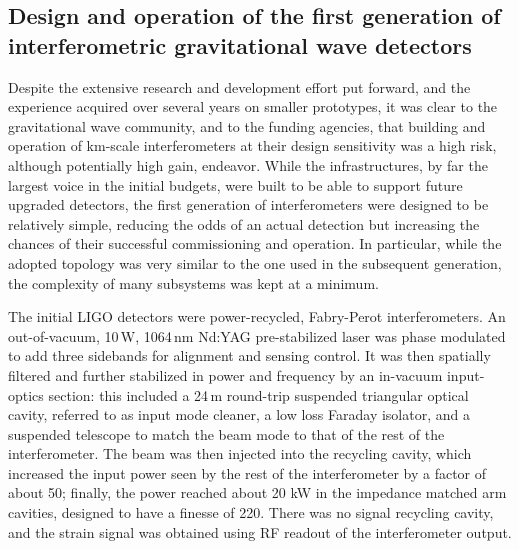 \subsection{Design and operation of the first generation of interferometric gravitational wave detectors}\label{subsec:1stgen}

Despite the extensive research and development effort put forward, and the experience acquired over several years on smaller prototypes, it was clear to the gravitational wave community, and to the funding agencies, that building and operation of km-scale interferometers at their design sensitivity was a high risk, although potentially high gain, endeavor.
While the infrastructures, by far the largest voice in the initial budgets, were built to be able to support future upgraded detectors, the first generation of interferometers were designed to be relatively simple, reducing the odds of an actual detection but increasing the chances of their successful commissioning and operation.
In particular, while the adopted topology was very similar to the one used in the subsequent generation, the complexity of many subsystems was kept at a minimum.

The initial LIGO detectors\cite{Abbott_2004,Abbott_2009} were power-recycled, Fabry-Perot interferometers.
An out-of-vacuum, 10\,W, 1064\,nm Nd:YAG pre-stabilized laser was phase modulated to add three sidebands for alignment and sensing control.
It was then spatially filtered and further stabilized in power and frequency by an in-vacuum input-optics section: this included a 24\,m round-trip suspended triangular optical cavity, referred to as input mode cleaner, a low loss Faraday isolator, and a suspended telescope to match the beam mode to that of the rest of the interferometer.
The beam was then injected into the recycling cavity,
which increased the input power seen by the rest of the interferometer by a factor of about 50; finally, the power reached about 20 kW in the impedance matched arm cavities, designed to have a finesse of 220. There was no signal recycling cavity, and the strain signal was obtained using RF readout of the interferometer output.


